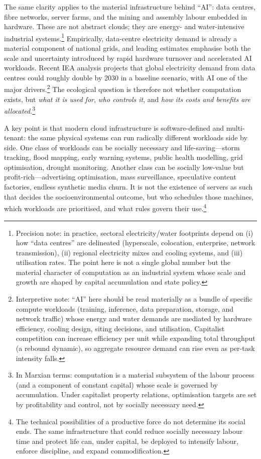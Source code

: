 The same clarity applies to the material infrastructure behind ``AI'': data centres, fibre networks,
server farms, and the mining and assembly labour embedded in hardware. These are not abstract clouds;
they are energy- and water-intensive industrial systems.\cite{IEADataCentres2019}\footnote{Precision note: in practice, sectoral electricity/water footprints depend on (i) how ``data centres'' are delineated (hyperscale, colocation, enterprise, network transmission), (ii) regional electricity mixes and cooling systems, and (iii) utilisation rates. The point here is not a single global number but the material character of computation as an industrial system whose scale and growth are shaped by capital accumulation and state policy.}
Empirically, data-centre electricity demand is already a material component of national grids,
and leading estimates emphasise both the scale and uncertainty introduced by rapid hardware
turnover and accelerated AI workloads.\cite{IEADataCentres2019,Masanet2020,LiEtAl2023Thirsty}
Recent IEA analysis projects that global electricity demand from data centres could roughly double by 2030 in a baseline scenario,
with AI one of the major drivers.\cite{IEAEnergyAI2025}\footnote{Interpretive note: ``AI'' here should be read materially as a bundle of specific compute workloads (training, inference, data preparation, storage, and network traffic) whose energy and water demands are mediated by hardware efficiency, cooling design, siting decisions, and utilisation. Capitalist competition can increase efficiency per unit while expanding total throughput (a rebound dynamic), so aggregate resource demand can rise even as per-task intensity falls.}
The ecological question is therefore not
whether computation exists, but \emph{what it is used for}, \emph{who controls it}, and \emph{how its costs
and benefits are allocated}.\footnote{In Marxian terms: computation is a material subsystem of the labour process (and a component of constant capital) whose scale is governed by accumulation. Under capitalist property relations, optimisation targets are set by profitability and control, not by socially necessary need.}

A key point is that modern cloud infrastructure is software-defined and multi-tenant: the same physical
systems can run radically different workloads side by side. One class of workloads can be socially
necessary and life-saving---storm tracking, flood mapping, early warning systems, public health modelling,
grid optimisation, drought monitoring. Another class can be socially low-value but profit-rich---advertising
optimisation, mass surveillance, speculative content factories, endless synthetic media churn.
It is not the existence of servers as such that decides the socioenvironmental outcome, but who schedules those machines, which workloads are prioritised,
and what rules govern their use.\footnote{The technical possibilities of a productive force do not determine its social ends. The same infrastructure that could reduce socially necessary labour time and protect life can, under capital, be deployed to intensify labour, enforce discipline, and expand commodification.}

